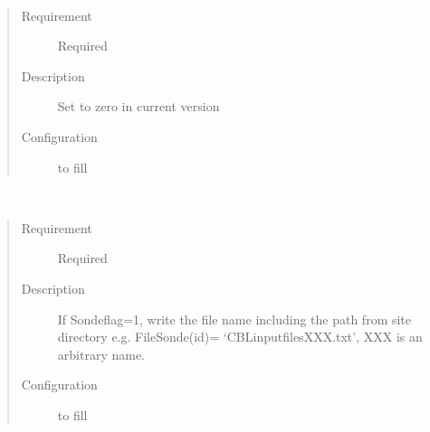 \documentclass[letterpaper,10pt,english]{sphinxmanual}
\begin{document}

\begin{fulllineitems}
\label{\detokenize{input_files/CBL_input/CBLinput:cmdoption-arg-co2-included}}~\begin{quote}\begin{description}
\item[{Requirement}] \leavevmode
Required

\item[{Description}] \leavevmode
Set to zero in current version

\item[{Configuration}] \leavevmode
to fill

\end{description}\end{quote}

\end{fulllineitems}


\begin{fulllineitems}
\label{\detokenize{input_files/CBL_input/CBLinput:cmdoption-arg-filesonde-id}}~\begin{quote}\begin{description}
\item[{Requirement}] \leavevmode
Required

\item[{Description}] \leavevmode
If Sondeflag=1, write the file name including the path from site directory e.g. FileSonde(id)= ‘CBLinputfilesXXX.txt’, XXX is an arbitrary name.

\item[{Configuration}] \leavevmode
to fill

\end{description}\end{quote}

\end{fulllineitems}

\end{document}
